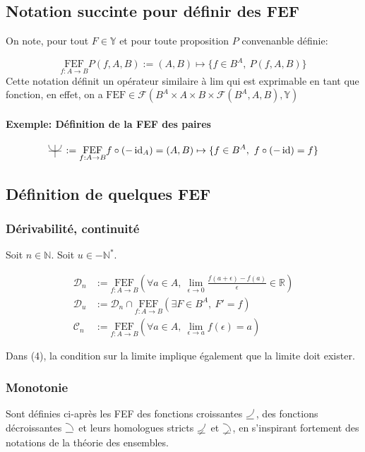 \documentclass{article}
\newcommand{\R}{{\mathbb R}}
\newcommand{\Y}{{\mathbb Y}}
\newcommand{\FEF}[1]{\underset{f:A\to B}{\text{FEF}}#1}
\newcommand{\N}{{\mathbb N}}
\newcommand{\cC}{{\mathcal C}}
\newcommand{\cD}{{\mathcal D}}
\newcommand{\cF}{{\mathcal F}}
\newcommand{\id}{\operatorname{id}}
\newcommand{\decreasingfunctions}{%
	\begin{tikzpicture}[scale=1.75, baseline=0]%
		\draw (0,-0.25ex) -- (1ex,-0.25ex);%
		\draw (1ex,0) arc (0:90:1ex);%
	\end{tikzpicture}\,%
}
\newcommand{\strictlydecreasingfunctions}{%
	\begin{tikzpicture}[scale=1.75, baseline=0]%
		\draw (0,-0.25ex) -- (1ex,-0.25ex);%
		\draw (1ex,0) arc (0:90:1ex);%
		\draw (0.75ex,0.125ex) -- (0.25ex,-0.5ex);%
	\end{tikzpicture}\,%
}
\newcommand{\increasingfunctions}{%
	\begin{tikzpicture}[scale=1.75, baseline=0]%
		\draw (0,-0.25ex) -- (1ex,-0.25ex);%
		\draw (0,0) arc (-90:0:1ex);%
	\end{tikzpicture}\,%
}
\newcommand{\strictlyincreasingfunctions}{%
	\begin{tikzpicture}[scale=1.75, baseline=0]%
		\draw (0,-0.25ex) -- (1ex,-0.25ex);%
		\draw (0,0) arc (-90:0:1ex);%
		\draw (0.75ex,0.125ex) -- (0.25ex,-0.5ex);%
	\end{tikzpicture}\,%
}
\newcommand{\evenfunctions}{%
	\begin{tikzpicture}[scale=1.5, baseline=-0.5ex]%
		\draw (-1ex,0) -- (1ex,0);%
		\draw (0,-1ex) -- (0, 1ex);%
		\draw (0ex, 0ex) arc (-90:0:1ex);%
		\draw (0ex, 0ex) arc (90:0:-1ex);%
	\end{tikzpicture}\,%
}
\begin{document}
\subsection{Notation succinte pour définir des FEF}

On note, pour tout $F \in \Y$ et pour toute proposition $P$ convenanble définie:

\[
	\FEF{P(f, A, B)} := (A, B) \mapsto \{f\in B^A,\ P(f, A, B)\} 
\]
Cette notation définit un opérateur similaire à $\text{lim}$ qui est exprimable en tant que fonction, en effet, on a $\text{FEF} \in \cF(B^A \times A \times B \times \cF(B^A, A, B), \Y)$

\paragraph{Exemple: Définition de la FEF des paires}

\[
	\evenfunctions := \FEF{f\circ (-\id_A)} = (A, B) \mapsto \{f\in B^A,\ f \circ (-\id) = f \} 
\] 

\subsection{Définition de quelques FEF}

\subsubsection{Dérivabilité, continuité}

Soit $n \in \N$. Soit $u \in -\N^\ast$.

\begin{align}
	\cD_n &:= \FEF{\left(\forall a\in A,\ \lim_{\epsilon \to 0} \frac{f(a+\epsilon)-f(a)}{\epsilon} \in \R\right)}  \\
	\cD_u &:= \cD_n \cap \FEF{\left(\exists F\in B^A,\ F' = f\right)} \\
	\cC_n &:= \FEF{\left( \forall a\in A,\ \lim_{\epsilon \to a} f(\epsilon) = a \right)  } 
\end{align}

Dans (4), la condition sur la limite implique également que la limite doit exister.

\subsubsection{Monotonie}

Sont définies ci-après les FEF des fonctions croissantes $\increasingfunctions$, des fonctions décroissantes $\decreasingfunctions$ et leurs homologues stricts $\strictlyincreasingfunctions$ et $\strictlydecreasingfunctions$, en s'inspirant fortement des notations de la théorie des ensembles.
\end{document}
